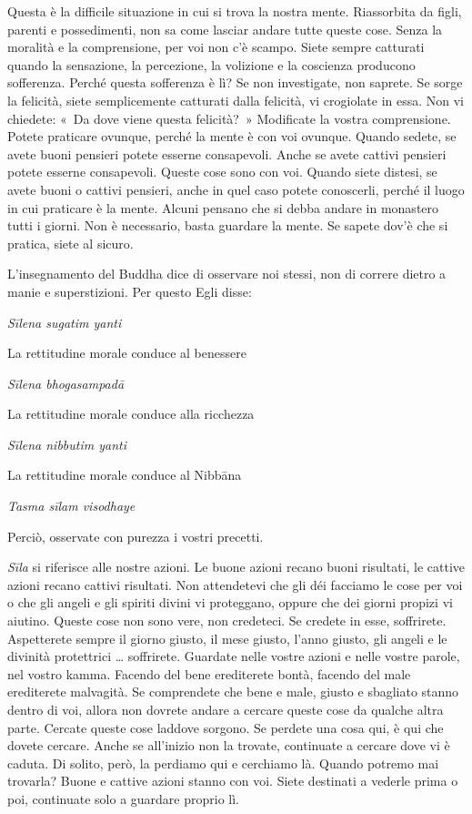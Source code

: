 Questa è la difficile situazione in cui si trova la nostra mente.
Riassorbita da figli, parenti e possedimenti, non sa come lasciar andare
tutte queste cose. Senza la moralità e la comprensione, per voi non c'è
scampo. Siete sempre catturati quando la sensazione, la percezione, la
volizione e la coscienza producono sofferenza. Perché questa sofferenza
è lì? Se non investigate, non saprete. Se sorge la felicità, siete
semplicemente catturati dalla felicità, vi crogiolate in essa. Non vi
chiedete: «~Da dove viene questa felicità?~» Modificate la vostra
comprensione. Potete praticare ovunque, perché la mente è con voi
ovunque. Quando sedete, se avete buoni pensieri potete esserne
consapevoli. Anche se avete cattivi pensieri potete esserne consapevoli.
Queste cose sono con voi. Quando siete distesi, se avete buoni o cattivi
pensieri, anche in quel caso potete conoscerli, perché il luogo in cui
praticare è la mente. Alcuni pensano che si debba andare in monastero
tutti i giorni. Non è necessario, basta guardare la mente. Se sapete
dov'è che si pratica, siete al sicuro.

L'insegnamento del Buddha dice di osservare noi stessi, non di correre
dietro a manie e superstizioni. Per questo Egli disse:

\emph{Sīlena sugatim yanti}

La rettitudine morale conduce al benessere

\emph{Sīlena bhogasampadā}

La rettitudine morale conduce alla ricchezza

\emph{Sīlena nibbutim yanti}

La rettitudine morale conduce al Nibbāna

\emph{Tasma sīlam visodhaye}

Perciò, osservate con purezza i vostri precetti.

\emph{Sīla} si riferisce alle nostre azioni. Le buone azioni recano
buoni risultati, le cattive azioni recano cattivi risultati. Non
attendetevi che gli déi facciamo le cose per voi o che gli angeli e gli
spiriti divini vi proteggano, oppure che dei giorni propizi vi aiutino.
Queste cose non sono vere, non credeteci. Se credete in esse,
soffrirete. Aspetterete sempre il giorno giusto, il mese giusto, l'anno
giusto, gli angeli e le divinità protettrici \ldots{} soffrirete. Guardate
nelle vostre azioni e nelle vostre parole, nel vostro kamma.
Facendo del bene erediterete bontà, facendo del male erediterete
malvagità. Se comprendete che bene e male, giusto e sbagliato stanno
dentro di voi, allora non dovrete andare a cercare queste cose da
qualche altra parte. Cercate queste cose laddove sorgono. Se perdete una
cosa qui, è qui che dovete cercare. Anche se all'inizio non la trovate,
continuate a cercare dove vi è caduta. Di solito, però, la perdiamo qui
e cerchiamo là. Quando potremo mai trovarla? Buone e cattive azioni
stanno con voi. Siete destinati a vederle prima o poi, continuate solo a
guardare proprio lì.

